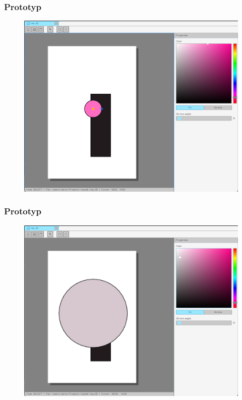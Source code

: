 \documentclass[
	11pt,]{beamer}
\begin{document}
\begin{frame}
	\frametitle{Prototyp}
	
	\begin{figure}
		\includegraphics[height=0.7\textheight]{figures/pro6.png}
	\end{figure}
\end{frame}

\begin{frame}
	\frametitle{Prototyp}
	
	\begin{figure}
		\includegraphics[height=0.7\textheight]{figures/pro7.png}
	\end{figure}
\end{frame}
\end{document}
